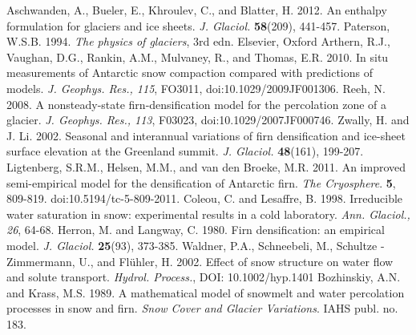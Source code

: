 \documentclass{article}%
\begin{document}
\newpage
\begin{thebibliography}{1}

  Aschwanden, A., Bueler, E., Khroulev, C., and Blatter, H. 2012. An enthalpy formulation for glaciers and ice sheets. \textit{J. Glaciol.} \textbf{58}(209), 441\mbox{-}457.
  Paterson, W.S.B. 1994. \textit{The physics of glaciers}, 3rd edn. Elsevier, Oxford
  Arthern, R.J., Vaughan, D.G., Rankin, A.M., Mulvaney, R., and Thomas, E.R. 2010. In situ measurements of Antarctic snow compaction compared with predictions of models. \textit{J. Geophys. Res., 115}, FO3011, doi:10.1029/2009JF001306.
  Reeh, N. 2008. A nonsteady\mbox{-}state firn\mbox{-}densification model for the percolation zone of a glacier. \textit{J. Geophys. Res., 113}, F03023, doi:10.1029/2007JF000746.
  Zwally, H. and J. Li. 2002. Seasonal and interannual variations of firn densification and ice\mbox{-}sheet surface elevation at the Greenland summit. \textit{J. Glaciol.} \textbf{48}(161), 199\mbox{-}207.
  Ligtenberg, S.R.M., Helsen, M.M., and van den Broeke, M.R. 2011. An improved semi\mbox{-}empirical model for the densification of Antarctic firn. \textit{The Cryosphere}. \textbf{5}, 809\mbox{-}819. doi:10.5194/tc\mbox{-}5\mbox{-}809\mbox{-}2011.
  \bibitem{}Coleou, C. and Lesaffre, B. 1998. Irreducible water saturation in snow: experimental results in a cold laboratory. \textit{Ann. Glaciol., 26}, 64\mbox{-}68.
  Herron, M. and Langway, C. 1980. Firn densification: an empirical model. \textit{J. Glaciol.} \textbf{25}(93), 373\mbox{-}385.
  Waldner, P.A., Schneebeli, M., Schultze \mbox{-} Zimmermann, U., and Fl\"{u}hler, H. 2002. Effect of snow structure on water flow and solute transport. \textit{Hydrol. Process.}, DOI: 10.1002/hyp.1401
  Bozhinskiy, A.N. and Krass, M.S. 1989. A mathematical model of snowmelt and water percolation processes in snow and firn. \textit{Snow Cover and Glacier Variations}. IAHS publ. no. 183.
\end{thebibliography}
\end{document}
